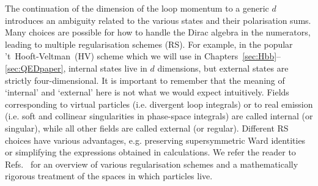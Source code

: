 \documentclass[main.tex]{subfiles}
\begin{document}
The continuation of the dimension of the loop momentum to a generic $d$ introduces an ambiguity related to the various states and their polarisation sums. Many choices are possible for how to handle the Dirac algebra in the numerators, leading to multiple regularisation schemes (RS). For example, in the popular \mbox{'t Hooft-Veltman (HV)} scheme which we will use in Chapters~\ref{sec:Hbb}--\ref{sec:QEDpaper}, internal states live in $d$ dimensions, but external states are strictly four-dimensional. It is important to remember that the meaning of `internal' and `external' here is not what we would expect intuitively. Fields corresponding to virtual particles (i.e. divergent loop integrals) or to real emission (i.e. soft and collinear singularities in phase-space integrals) are called internal (or singular), while all other fields are called external (or regular). Different RS choices have various advantages, e.g. preserving supersymmetric Ward identities or simplifying the expressions obtained in calculations. We refer the reader to Refs.~\cite{Signer:2008va, Gnendiger:2017pys} for an overview of various regularisation schemes and a mathematically rigorous treatment of the spaces in which particles live.

%
\end{document}
